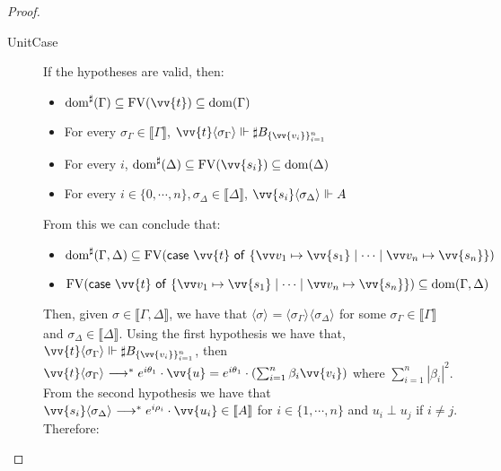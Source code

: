 \documentclass[runningheads,orivec,envcountsame,envcountsect]{llncs}
\newcommand\lra{\longrightarrow}
\newcommand\ansubst[2]{\ensuremath{\langle #1 \rangle_{#2}}}
\newcommand\dom[1]{\mathrm{dom}(#1)}
\newcommand\sdom[1]{\mathrm{dom}^{\sharp}(#1)}
\newcommand\FV[1]{\mathrm{FV}(#1)}
\def\gencase#1#2#3#4#5{\ensuremath{\mathsf{case}~#1~\mathsf{of}~\{#2\mapsto #4 \mid \dotsb \mid #3\mapsto #5\}}}
\def\eval{\lra^*}
\def\sem#1{\llbracket#1\rrbracket}
\def\real{\Vdash}
\newcommand\genbasis[3]{\ensuremath{B_{\{#1\}_{#2}^{#3}}}}
\begin{document}
\begin{proof}
\begin{description}
    \item[UnitCase] If the hypotheses are valid, then:
    \begin{itemize}
        \item $\sdom{\Gamma}\subseteq \FV{\vv{t}}\subseteq \dom{\Gamma}$
        \item For every $\sigma_\Gamma\in\sem{\Gamma}$, $\vv{t}\ansubst{\sigma_\Gamma}{}\real\sharp\genbasis{\vv{v_i}}{i=1}{n}$
        \item For every $i$, $\sdom{\Delta}\subseteq \FV{\vv{s_i}}\subseteq \dom{\Delta}$
        \item For every $i\in\{0,\dotsb ,n\}, \sigma_\Delta\in\sem{\Delta}$, $\vv{s_i}\ansubst{\sigma_\Delta}{}\real A$
    \end{itemize}
    
    From this we can conclude that:
    
    \begin{itemize}
        \item $\sdom{\Gamma,\Delta}\subseteq \FV{\gencase{\vv{t}}{\vv v_1}{\vv v_n}{\vv{s_1}}{\vv{s_n}}}$
        \item $\FV{\gencase{\vv{t}}{\vv v_1}{\vv v_n}{\vv{s_1}}{\vv{s_n}}}\subseteq \dom{\Gamma,\Delta}$
    \end{itemize}
    
    Then, given $\sigma\in\sem{\Gamma,\Delta}$, we have that $\ansubst{\sigma}{}=\ansubst{\sigma_\Gamma}{}\ansubst{\sigma_\Delta}{}$ for some $\sigma_\Gamma\in\sem{\Gamma}$ and $\sigma_\Delta\in\sem{\Delta}$. Using the first hypothesis we have that, $\vv{t}\ansubst{\sigma_\Gamma}{}\real\sharp\genbasis{\vv{v_i}}{i=1}{n}$, then $\vv{t}\ansubst{\sigma_\Gamma}{}\eval e^{i\theta_1}\cdot\vv{u}=e^{i\theta_1}\cdot(\sum_{i=1}^{n}\beta_i \vv{v_i})$ where $\sum_{i=1}^{n}|\beta_i|^2$. From the second hypothesis we have that $\vv{s_i}\ansubst{\sigma_\Delta}{}\eval e^{i\rho_i}\cdot\vv{u_i}\in\sem{A}$ for $i\in\{1,\dotsb ,n\}$ and $u_i\perp u_j$ if $i\neq j$. Therefore:


\end{description}
\end{proof}
\end{document}
